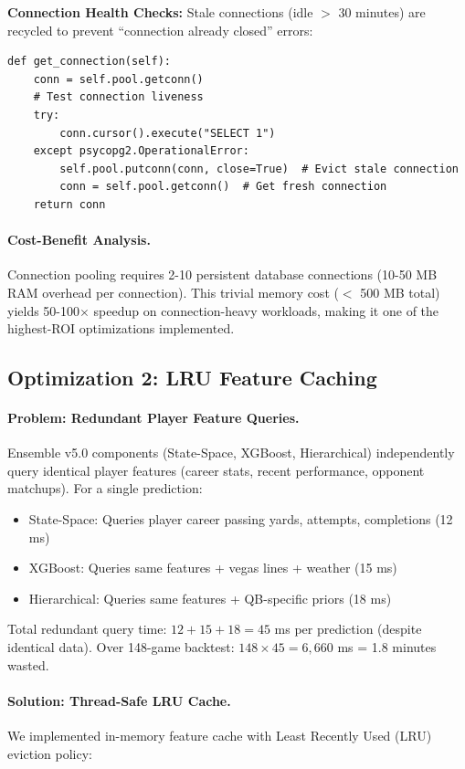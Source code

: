 \textbf{Connection Health Checks:}
Stale connections (idle $>$ 30 minutes) are recycled to prevent ``connection already closed'' errors:

\begin{verbatim}
def get_connection(self):
    conn = self.pool.getconn()
    # Test connection liveness
    try:
        conn.cursor().execute("SELECT 1")
    except psycopg2.OperationalError:
        self.pool.putconn(conn, close=True)  # Evict stale connection
        conn = self.pool.getconn()  # Get fresh connection
    return conn
\end{verbatim}

\paragraph{Cost-Benefit Analysis.}
Connection pooling requires 2-10 persistent database connections (10-50 MB RAM overhead per connection). This trivial memory cost ($<$ 500 MB total) yields 50-100$\times$ speedup on connection-heavy workloads, making it one of the highest-ROI optimizations implemented.

\subsection{Optimization 2: LRU Feature Caching}

\paragraph{Problem: Redundant Player Feature Queries.}
Ensemble v5.0 components (State-Space, XGBoost, Hierarchical) independently query identical player features (career stats, recent performance, opponent matchups). For a single prediction:

\begin{itemize}[itemsep=2pt,parsep=0pt]
    \item State-Space: Queries player career passing yards, attempts, completions (12 ms)
    \item XGBoost: Queries same features + vegas lines + weather (15 ms)
    \item Hierarchical: Queries same features + QB-specific priors (18 ms)
\end{itemize}

Total redundant query time: $12 + 15 + 18 = 45$ ms per prediction (despite identical data). Over 148-game backtest: $148 \times 45 = 6,660$ ms = 1.8 minutes wasted.

\paragraph{Solution: Thread-Safe LRU Cache.}
We implemented in-memory feature cache with Least Recently Used (LRU) eviction policy:

